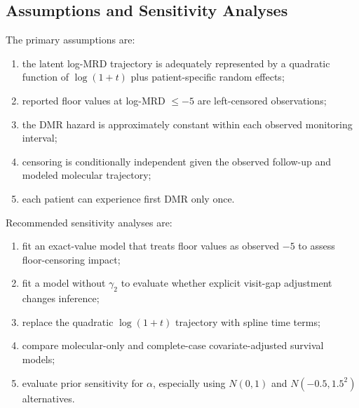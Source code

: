 \subsection{Assumptions and Sensitivity Analyses}

The primary assumptions are:
\begin{enumerate}
  \item the latent log-MRD trajectory is adequately represented by a quadratic function of \(\log(1+t)\) plus patient-specific random effects;
  \item reported floor values at log-MRD \(\leq -5\) are left-censored observations;
  \item the DMR hazard is approximately constant within each observed monitoring interval;
  \item censoring is conditionally independent given the observed follow-up and modeled molecular trajectory;
  \item each patient can experience first DMR only once.
\end{enumerate}
Recommended sensitivity analyses are:
\begin{enumerate}
  \item fit an exact-value model that treats floor values as observed \(-5\) to assess floor-censoring impact;
  \item fit a model without \(\gamma_2\) to evaluate whether explicit visit-gap adjustment changes inference;
  \item replace the quadratic \(\log(1+t)\) trajectory with spline time terms;
  \item compare molecular-only and complete-case covariate-adjusted survival models;
  \item evaluate prior sensitivity for \(\alpha\), especially using \(N(0,1)\) and \(N(-0.5,1.5^2)\) alternatives.
\end{enumerate}

